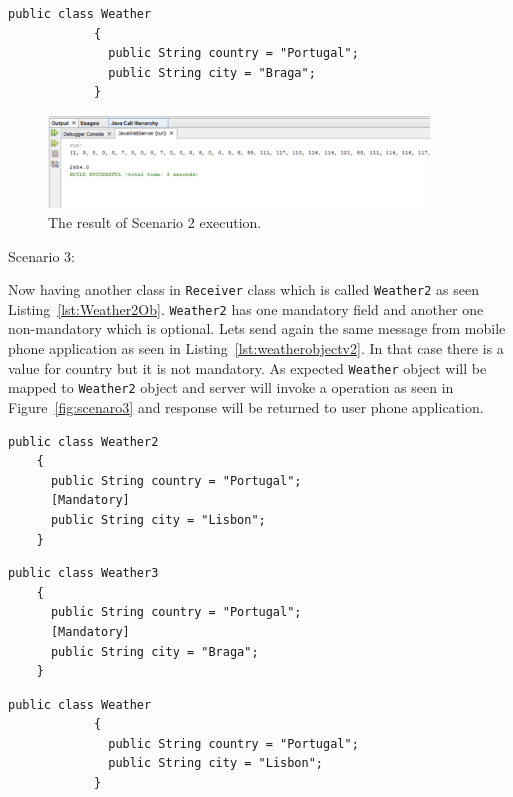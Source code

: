 \begin{lstlisting}[caption=Simple weather object class, label=lst:weatherobject2]
          public class Weather
            {
              public String country = "Portugal";
              public String city = "Braga";
            }
\end{lstlisting}

\begin{figure}[!htb]
  \centering
  \includegraphics[width=0.9\textwidth]{Figures/scenari2.png}
  \caption[The result of Scenario 2 execution.]{The result of Scenario 2 execution.}
  \label{fig:scenaro2}
\end{figure}

Scenario 3:

Now having another class in {\tt Receiver} class which is called {\tt Weather2} as seen Listing~\ref{lst:Weather2Ob}. {\tt Weather2} has one mandatory field and another one non-mandatory which is optional. Lets send again the same message from mobile phone application as seen in Listing~\ref{lst:weatherobjectv2}. In that case there is a value for country but it is not mandatory. As expected {\tt Weather} object will be mapped to {\tt Weather2} object and server will invoke a operation as seen in Figure~\ref{fig:scenaro3} and response will be returned to user phone application.

\begin{lstlisting}[caption=Weather2 object in Receiver, label=lst:Weather2Ob]
  public class Weather2
    {
      public String country = "Portugal";
      [Mandatory]
      public String city = "Lisbon";
    }
\end{lstlisting}
\begin{lstlisting}[caption=Weather3 object in Receiver, label=lst:Weather3Ob]
  public class Weather3
    {
      public String country = "Portugal";
      [Mandatory]
      public String city = "Braga";
    }
\end{lstlisting}
\begin{lstlisting}[caption=Simple weather object class, label=lst:weatherobjectv2]
          public class Weather
            {
              public String country = "Portugal";
              public String city = "Lisbon";
            }
\end{lstlisting}


